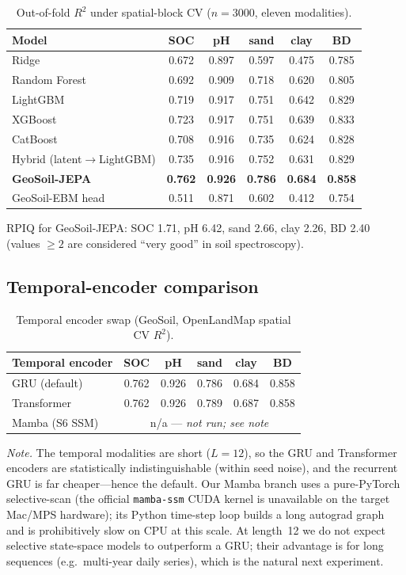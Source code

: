\documentclass[11pt]{article}
\begin{document}
\begin{table}[H]\centering\small
\caption{Out-of-fold $R^2$ under spatial-block CV ($n=3000$, eleven modalities).}
\label{tab:bakeoff}
\begin{tabular}{lccccc}
\toprule
Model & SOC & pH & sand & clay & BD \\
\midrule
Ridge            & 0.672 & 0.897 & 0.597 & 0.475 & 0.785 \\
Random Forest    & 0.692 & 0.909 & 0.718 & 0.620 & 0.805 \\
LightGBM         & 0.719 & 0.917 & 0.751 & 0.642 & 0.829 \\
XGBoost          & 0.723 & 0.917 & 0.751 & 0.639 & 0.833 \\
CatBoost         & 0.708 & 0.916 & 0.735 & 0.624 & 0.828 \\
Hybrid (latent$\rightarrow$LightGBM) & 0.735 & 0.916 & 0.752 & 0.631 & 0.829 \\
\textbf{GeoSoil-JEPA} & \textbf{0.762} & \textbf{0.926} & \textbf{0.786} & \textbf{0.684} & \textbf{0.858} \\
GeoSoil-EBM head & 0.511 & 0.871 & 0.602 & 0.412 & 0.754 \\
\bottomrule
\end{tabular}
\end{table}

RPIQ for GeoSoil-JEPA: SOC 1.71, pH 6.42, sand 2.66, clay 2.26, BD 2.40 (values
$\ge 2$ are considered ``very good'' in soil spectroscopy).

\subsection{Temporal-encoder comparison}
\begin{table}[H]\centering\small
\caption{Temporal encoder swap (GeoSoil, OpenLandMap spatial CV $R^2$).}
\label{tab:temporal}
\begin{tabular}{lccccc}
\toprule
Temporal encoder & SOC & pH & sand & clay & BD \\
\midrule
GRU (default)  & 0.762 & 0.926 & 0.786 & 0.684 & 0.858 \\
Transformer    & 0.762 & 0.926 & 0.789 & 0.687 & 0.858 \\
Mamba (S6 SSM) & \multicolumn{5}{c}{n/a --- \emph{not run; see note}} \\
\bottomrule
\end{tabular}
\end{table}

\noindent\emph{Note.} The temporal modalities are short ($L=12$), so the GRU and
Transformer encoders are statistically indistinguishable (within seed noise), and the
recurrent GRU is far cheaper---hence the default. Our Mamba branch uses a pure-PyTorch
selective-scan (the official \texttt{mamba-ssm} CUDA kernel is unavailable on the
target Mac/MPS hardware); its Python time-step loop builds a long autograd graph and is
prohibitively slow on CPU at this scale. At length~12 we do not expect selective
state-space models to outperform a GRU; their advantage is for long sequences (e.g.\
multi-year daily series), which is the natural next experiment.
\end{document}
